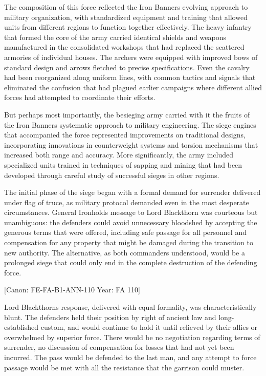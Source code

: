 The composition of this force reflected the Iron
Banner\textquotesingle s evolving approach to military organization,
with standardized equipment and training that allowed units from
different regions to function together effectively. The heavy infantry
that formed the core of the army carried identical shields and weapons
manufactured in the consolidated workshops that had replaced the
scattered armories of individual houses. The archers were equipped with
improved bows of standard design and arrows fletched to precise
specifications. Even the cavalry had been reorganized along uniform
lines, with common tactics and signals that eliminated the confusion
that had plagued earlier campaigns where different allied forces had
attempted to coordinate their efforts.

But perhaps most importantly, the besieging army carried with it the
fruits of the Iron Banner\textquotesingle s systematic approach to
military engineering. The siege engines that accompanied the force
represented improvements on traditional designs, incorporating
innovations in counterweight systems and torsion mechanisms that
increased both range and accuracy. More significantly, the army included
specialized units trained in techniques of sapping and mining that had
been developed through careful study of successful sieges in other
regions.

The initial phase of the siege began with a formal demand for surrender
delivered under flag of truce, as military protocol demanded even in the
most desperate circumstances. General Ironhold\textquotesingle s message
to Lord Blackthorn was courteous but unambiguous: the defenders could
avoid unnecessary bloodshed by accepting the generous terms that were
offered, including safe passage for all personnel and compensation for
any property that might be damaged during the transition to new
authority. The alternative, as both commanders understood, would be a
prolonged siege that could only end in the complete destruction of the
defending force.

{[}Canon: FE-FA-B1-ANN-110 \textbar{} Year: FA 110{]}

Lord Blackthorn\textquotesingle s response, delivered with equal
formality, was characteristically blunt. The defenders held their
position by right of ancient law and long-established custom, and would
continue to hold it until relieved by their allies or overwhelmed by
superior force. There would be no negotiation regarding terms of
surrender, no discussion of compensation for losses that had not yet
been incurred. The pass would be defended to the last man, and any
attempt to force passage would be met with all the resistance that the
garrison could muster.

